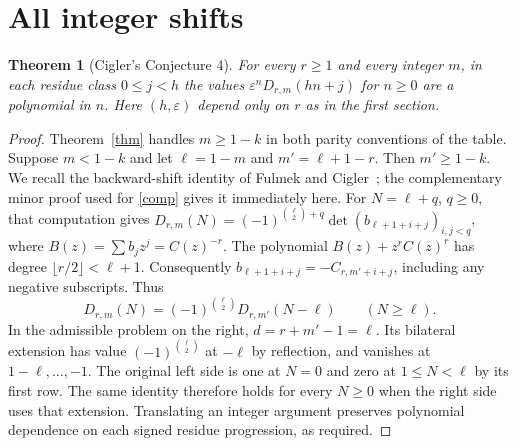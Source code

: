 \documentclass[11pt]{article}
\newtheorem{theorem}{Theorem}
\newcommand{\ee}{\varepsilon}
\begin{document}
\section{All integer shifts}
\begin{theorem}[Cigler's Conjecture 4]
For every $r\ge1$ and every integer $m$, in each residue class $0\le j<h$ the values $\ee^nD_{r,m}(hn+j)$ for $n\ge0$ are a polynomial in $n$. Here $(h,\ee)$ depend only on $r$ as in the first section.
\end{theorem}
\begin{proof}
Theorem~\ref{thm} handles $m\ge1-k$ in both parity conventions of the table. Suppose $m<1-k$ and let $\ell=1-m$ and $m'=\ell+1-r$. Then $m'\ge1-k$. We recall the backward-shift identity of Fulmek and Cigler~\cite{fulmek,revisit}; the complementary minor proof used for \eqref{comp} gives it immediately here. For $N=\ell+q$, $q\ge0$, that computation gives $D_{r,m}(N)=(-1)^{\binom\ell2+q}\det(b_{\ell+1+i+j})_{i,j<q}$, where $B(z)=\sum b_jz^j=C(z)^{-r}$. The polynomial $B(z)+z^rC(z)^r$ has degree $\lfloor r/2\rfloor<\ell+1$. Consequently $b_{\ell+1+i+j}=-C_{r,m'+i+j}$, including any negative subscripts. Thus
\[
 D_{r,m}(N)=(-1)^{\binom\ell2}D_{r,m'}(N-\ell)\qquad(N\ge\ell).
\]
In the admissible problem on the right, $d=r+m'-1=\ell$. Its bilateral extension has value $(-1)^{\binom\ell2}$ at $-\ell$ by reflection, and vanishes at $1-\ell,\ldots,-1$. The original left side is one at $N=0$ and zero at $1\le N<\ell$ by its first row. The same identity therefore holds for every $N\ge0$ when the right side uses that extension. Translating an integer argument preserves polynomial dependence on each signed residue progression, as required.
\end{proof}
\end{document}
